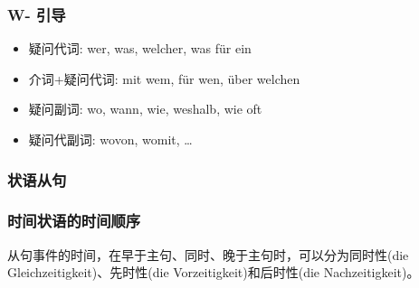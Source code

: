 


\subsubsection*{W- 引导}

\begin{itemize}
    \item 疑问代词: wer, was, welcher, was für ein
    \item 介词+疑问代词: mit wem, für wen, über welchen
    \item 疑问副词: wo, wann, wie, weshalb, wie oft
    \item 疑问代副词: wovon, womit, \ldots
\end{itemize}


\subsubsection{状语从句}

\subsubsection*{时间状语的时间顺序}

从句事件的时间，在早于主句、同时、晚于主句时，可以分为同时性(die Gleichzeitigkeit)、先时性(die Vorzeitigkeit)和后时性(die Nachzeitigkeit)。

